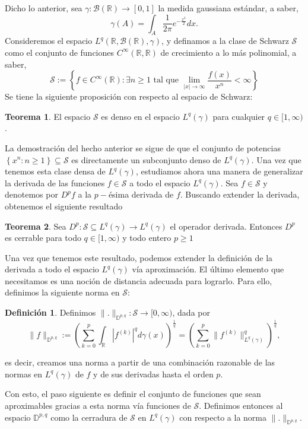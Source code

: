 \documentclass[letterpaper,twoside,12pt]{book}
\newcommand{\R}{\mathbb{R}}
\newcommand{\B}{\mathcal{B}}
\renewcommand{\S}{\mathcal{S}}
\newcommand{\1}{\mathds{1}}
\renewcommand{\to}{\rightarrow}
\theoremstyle{definition}
\newtheorem{dfn}{Definición}
\theoremstyle{definition}
\newtheorem{teo}{Teorema}
\theoremstyle{definition}
\theoremstyle{definition}
\theoremstyle{definition}
\theoremstyle{definition}
\theoremstyle{definition}
\begin{document}
Dicho lo anterior, sea $\gamma:\B(\R)\to [0,1]$ la medida gaussiana estándar, a saber, 
\[
\gamma(A)=\int_A\frac{1}{2\pi}e^{-\frac{x^2}{2}}dx.    
\]
Consideremos el espacio $L^{q}(\R,\B(\R),\gamma)$, y definamos a la clase de Schwarz $\mathcal{S}$ como el conjunto de funciones $C^{\infty}(\R,\R)$ de crecimiento a lo más polinomial, 
a saber, 
\[
\mathcal{S}:=\left\{f\in C^{\infty}(\R) : \exists n\geq1 \text{ tal que }\lim_{|x|\to\infty}\frac{f(x)}{x^{n}}<\infty \right\}    
\]
Se tiene la siguiente proposición con respecto al espacio de Schwarz:
\begin{teo}
    El espacio $\mathcal{S}$ es denso en el espacio $L^{q}(\gamma)$ para cualquier $q\in [1,\infty)$.
\end{teo}
La demostración del hecho anterior se sigue de que el conjunto de potencias $\left\{x^{n}:n\geq1\right\}\subseteq \mathcal{S}$ es directamente un subconjunto denso de $L^{q}(\gamma)$. Una vez que tenemos esta clase densa de $L^{q}(\gamma)$, estudiamos ahora una manera de generalizar la derivada de las funciones $f\in \mathcal{S}$ a todo el espacio $L^{q}(\gamma)$. Sea $f\in \mathcal{S}$ y denotemos por $D^{p}f$ a la $p-$ésima derivada de $f$. Buscando extender la derivada, obtenemos el siguiente resultado
\begin{teo} 
 Sea $D^{p}:\mathcal{S}\subseteq L^{q}(\gamma)\longrightarrow L^{q}(\gamma)$ el operador derivada. Entonces $D^{p}$ es cerrable para todo $q\in [1,\infty)$ y todo entero $p\geq1$
 \end{teo}
Una vez que tenemos este resultado, podemos extender la definición de la derivada a todo el espacio $L^{q}(\gamma)$ vía aproximación. El último elemento que necesitamos es una noción de distancia adecuada para lograrlo. Para ello, definimos la siguiente norma en $\mathcal{S}$:
\begin{dfn}
    Definimos $\|.\|_{\mathbb{D}^{p,q}}:\mathcal{S}\longrightarrow[0,\infty)$, dada por 
    \[
        \|f\|_{\mathbb{D}^{p,q}}:=\left(\sum_{k=0}^{p}\int_\R|f^{(k)}|^qd\gamma(x)\right)^{\frac{1}{q}}=\left(\sum_{k=0}^{p}\|f^{(k)}\|^q_{L^{q}(\gamma)}\right)^{\frac{1}{q}},
    \]
\end{dfn}
es decir, creamos una norma a partir de una combinación razonable de las normas en $L^{q}(\gamma)$ de $f$ y de sus derivadas hasta el orden $p$.

Con esto, el paso siguiente es definir el conjunto de funciones que sean aproximables gracias a esta norma vía funciones de $\mathcal{S}$. Definimos entonces al espacio $\mathbb{D}^{p,q}$ como la cerradura de $\S$ en $L^{q}(\gamma)$ con respecto a la norma $\|.\|_{\mathbb{D}^{p,q}}$.
\end{document}
